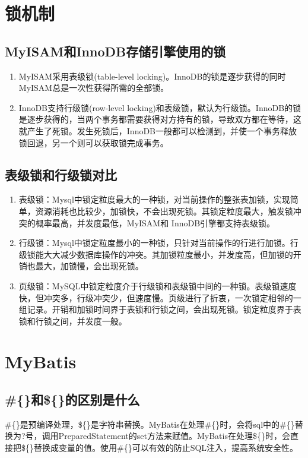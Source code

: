 \documentclass[a4paper]{report}
\begin{document}
\section{锁机制}
\subsection{MyISAM和InnoDB存储引擎使用的锁}
\begin{enumerate}
    \item MyISAM采用表级锁(table-level locking)。InnoDB的锁是逐步获得的同时MyISAM总是一次性获得所需的全部锁。
    \item InnoDB支持行级锁(row-level locking)和表级锁，默认为行级锁。InnoDB的锁是逐步获得的，当两个事务都需要获得对方持有的锁，导致双方都在等待，这就产生了死锁。发生死锁后，InnoDB一般都可以检测到，并使一个事务释放锁回退，另一个则可以获取锁完成事务。
\end{enumerate}

\subsection{表级锁和行级锁对比}
\begin{enumerate}
    \item 表级锁：Mysql中锁定粒度最大的一种锁，对当前操作的整张表加锁，实现简单，资源消耗也比较少，加锁快，不会出现死锁。其锁定粒度最大，触发锁冲突的概率最高，并发度最低，MyISAM和 InnoDB引擎都支持表级锁。
    \item 行级锁：Mysql中锁定粒度最小的一种锁，只针对当前操作的行进行加锁。行级锁能大大减少数据库操作的冲突。其加锁粒度最小，并发度高，但加锁的开销也最大，加锁慢，会出现死锁。
    \item 页级锁：MySQL中锁定粒度介于行级锁和表级锁中间的一种锁。表级锁速度快，但冲突多，行级冲突少，但速度慢。页级进行了折衷，一次锁定相邻的一组记录。开销和加锁时间界于表锁和行锁之间，会出现死锁。锁定粒度界于表锁和行锁之间，并发度一般。
\end{enumerate}

\section{MyBatis}
\subsection{\#\{\}和\$\{\}的区别是什么}
\#\{\}是预编译处理，\$\{\}是字符串替换。MyBatis在处理\#\{\}时，会将sql中的\#\{\}替换为?号，调用PreparedStatement的set方法来赋值。MyBatis在处理\$\{\}时，会直接把\$\{\}替换成变量的值。使用\#\{\}可以有效的防止SQL注入，提高系统安全性。
\end{document}

